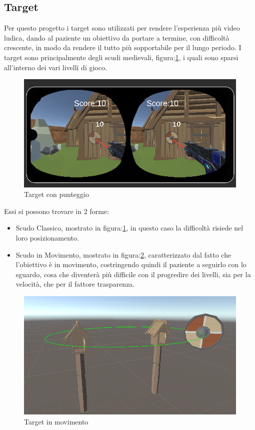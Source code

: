 \documentclass[
a4paper,
cleardoublepage=empty,
headings=twolinechapter,
numbers=autoenddot,
]{scrbook}
\begin{document}
    \subsection{Target}
    Per questo progetto i target sono utilizzati per rendere l'esperienza più video ludica, dando al paziente un obiettivo da portare a termine, con difficoltà crescente, in modo da rendere il tutto più sopportabile per il lungo periodo.
    I target sono principalmente degli scudi medievali, figura:\ref{fig:target_score}, i quali sono sparsi all'interno dei vari livelli di gioco.
    \begin{figure}[H]
	  	\centering
	  	\includegraphics[width=0.7\linewidth]{image/target_score}
	  	\caption{Target con punteggio}
	  	\label{fig:target_score}
    \end{figure}
    Essi si possono trovare in 2 forme:
    \begin{itemize}
       \item Scudo Classico, mostrato in figura:\ref{fig:target_score}, in questo caso la difficoltà risiede nel loro posizionamento.
       \item Scudo in Movimento, mostrato in figura:\ref{fig:target_movimento}, caratterizzato dal fatto che l'obiettivo è in movimento, costringendo quindi il paziente a seguirlo con lo sguardo, cosa che diventerà più difficile con il progredire dei livelli, sia per la velocità, che per il fattore trasparenza.
      \end{itemize}
  \begin{figure}[H]
  	\centering
  	\includegraphics[width=0.7\linewidth]{image/target_movimento}
  	\caption{Target in movimento}
  	\label{fig:target_movimento}
  \end{figure}
\end{document}
